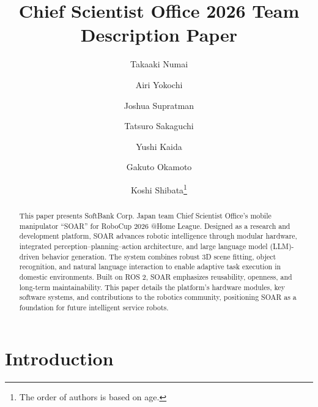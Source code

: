 \documentclass[runningheads,a4paper]{llncs}
\title{Chief Scientist Office 2026 Team Description Paper}
\author{Takaaki Numai \and Airi Yokochi \and Joshua Supratman \and Tatsuro Sakaguchi \and Yushi Kaida \and Gakuto Okamoto \and Koshi Shibata\thanks{The order of authors is based on age.}}
\institute{SoftBank Corp. Chief Scientist Office \\
	\texttt{https://www.robocup.ros-sier.com/, https://github.com/sbgisen}}
\begin{document}
\maketitle
%
%

\begin{abstract}
	This paper presents SoftBank Corp. Japan team Chief Scientist Office’s mobile manipulator “SOAR” for RoboCup 2026 @Home League.
    Designed as a research and development platform, SOAR advances robotic intelligence through modular hardware, integrated perception–planning–action architecture, and large language model (LLM)-driven behavior generation.
	The system combines robust 3D scene fitting, object recognition, and natural language interaction to enable adaptive task execution in domestic environments.
	Built on ROS 2, SOAR emphasizes reusability, openness, and long-term maintainability.
	This paper details the platform’s hardware modules, key software systems, and contributions to the robotics community, positioning SOAR as a foundation for future intelligent service robots.
\end{abstract}



\section{Introduction}
\end{document}
